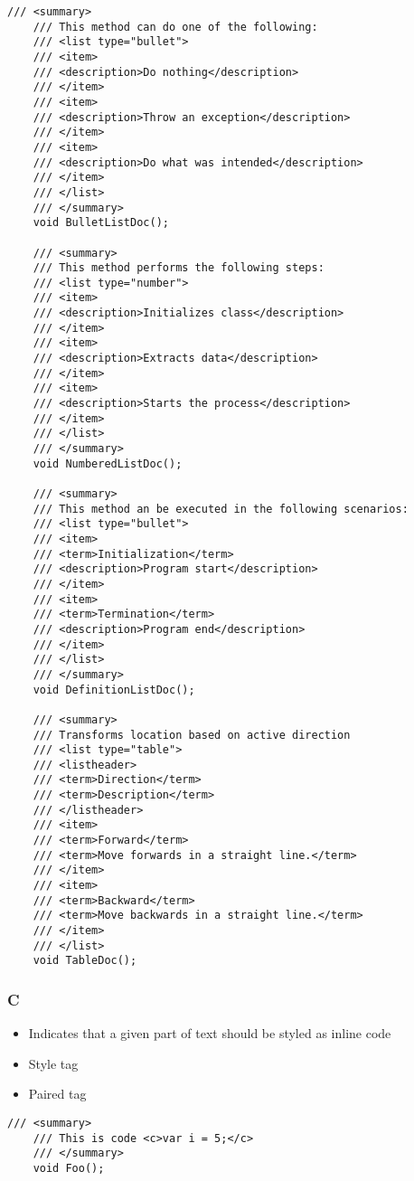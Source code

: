 \begin{lstlisting}[caption=List tag \cite{carr_adding_2012}]
    /// <summary>
    /// This method can do one of the following:
    /// <list type="bullet">
    /// <item>
    /// <description>Do nothing</description>
    /// </item>
    /// <item>
    /// <description>Throw an exception</description>
    /// </item>
    /// <item>
    /// <description>Do what was intended</description>
    /// </item>
    /// </list>
    /// </summary>
    void BulletListDoc();

    /// <summary>
    /// This method performs the following steps:
    /// <list type="number">
    /// <item>
    /// <description>Initializes class</description>
    /// </item>
    /// <item>
    /// <description>Extracts data</description>
    /// </item>
    /// <item>
    /// <description>Starts the process</description>
    /// </item>
    /// </list>
    /// </summary>
    void NumberedListDoc();

    /// <summary>
    /// This method an be executed in the following scenarios:
    /// <list type="bullet">
    /// <item>
    /// <term>Initialization</term>
    /// <description>Program start</description>
    /// </item>
    /// <item>
    /// <term>Termination</term>
    /// <description>Program end</description>
    /// </item>
    /// </list>
    /// </summary>
    void DefinitionListDoc();

    /// <summary>
    /// Transforms location based on active direction
    /// <list type="table">
    /// <listheader>
    /// <term>Direction</term>
    /// <term>Description</term>
    /// </listheader>
    /// <item>
    /// <term>Forward</term>
    /// <term>Move forwards in a straight line.</term>
    /// </item>
    /// <item>
    /// <term>Backward</term>
    /// <term>Move backwards in a straight line.</term>
    /// </item>
    /// </list>
    void TableDoc();
\end{lstlisting}

\subsubsection*{C}
\begin{itemize}
    \item Indicates that a given part of text should be styled as inline code
    \item Style tag
    \item Paired tag
\end{itemize}

\begin{lstlisting}[caption=C tag]
    /// <summary>
    /// This is code <c>var i = 5;</c>
    /// </summary>
    void Foo();
\end{lstlisting}

